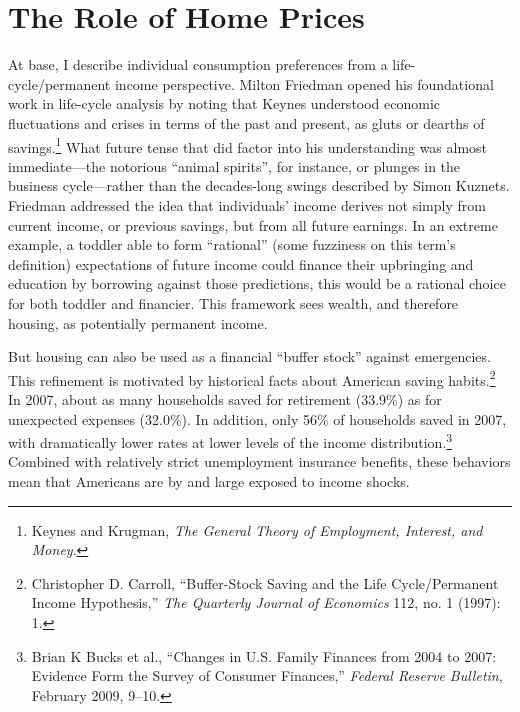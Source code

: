\documentclass[12pt,oneside]{psthesis}
\begin{document}
\hypertarget{home-prices}{%
\section{The Role of Home Prices}\label{home-prices}}

At base, I describe individual consumption preferences from a life-cycle/permanent income perspective.
Milton Friedman opened his foundational work in life-cycle analysis by noting that Keynes understood economic fluctuations and crises in terms of the past and present, as gluts or dearths of savings.\footnote{Keynes and Krugman, \emph{The General Theory of Employment, Interest, and Money}.}
What future tense that did factor into his understanding was almost immediate---the notorious ``animal spirits'', for instance, or plunges in the business cycle---rather than the decades-long swings described by Simon Kuznets.
Friedman addressed the idea that individuals' income derives not simply from current income, or previous savings, but from all future earnings.
In an extreme example, a toddler able to form ``rational'' (some fuzziness on this term's definition) expectations of future income could finance their upbringing and education by borrowing against those predictions, this would be a rational choice for both toddler and financier.
This framework sees wealth, and therefore housing, as potentially permanent income.

But housing can also be used as a financial ``buffer stock'' against emergencies.
This refinement is motivated by historical facts about American saving habits.\footnote{Christopher D. Carroll, ``Buffer-Stock Saving and the Life Cycle/Permanent Income Hypothesis,'' \emph{The Quarterly Journal of Economics} 112, no. 1 (1997): 1.}
In 2007, about as many households saved for retirement (33.9\%) as for unexpected expenses (32.0\%).
In addition, only 56\% of households saved in 2007, with dramatically lower rates at lower levels of the income distribution.\footnote{Brian K Bucks et al., ``Changes in U.S. Family Finances from 2004 to 2007: Evidence Form the Survey of Consumer Finances,'' \emph{Federal Reserve Bulletin}, February 2009, 9--10.}
Combined with relatively strict unemployment insurance benefits, these behaviors mean that Americans are by and large exposed to income shocks.
\end{document}
